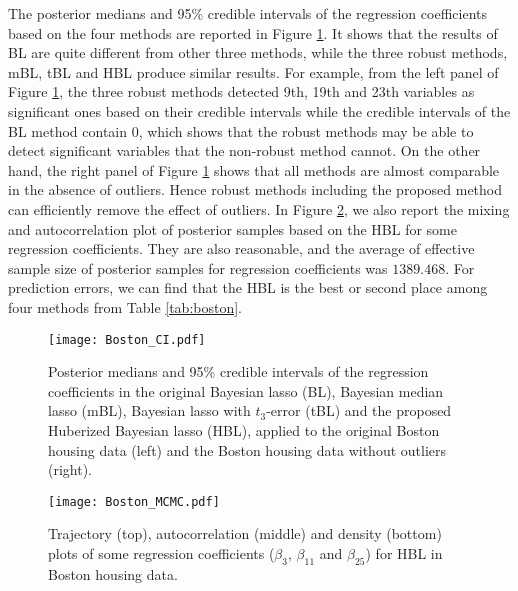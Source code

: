\documentclass[11pt]{article}
\theoremstyle{plain}
\theoremstyle{definition}
\begin{document}
The posterior medians and 95\% credible intervals of the regression coefficients based on the four methods are reported in Figure \ref{fig:boston_CI}. It shows that the results of BL are quite different from other three methods, while the three robust methods, mBL, tBL and HBL produce similar results. For example, from the left panel of Figure \ref{fig:boston_CI}, the three robust methods detected 9th, 19th and 23th variables as significant ones based on their credible intervals while the credible intervals of the BL method contain 0, which shows that the robust methods may be able to detect significant variables that the non-robust method cannot. On the other hand, the right panel of Figure \ref{fig:boston_CI} shows that all methods are almost comparable in the absence of outliers. Hence robust methods including the proposed method can efficiently remove the effect of outliers. In Figure \ref{fig:boston_MCMC}, we also report the mixing and autocorrelation plot of posterior samples based on the HBL for some regression coefficients. They are also reasonable, and the average of effective sample size of posterior samples for regression coefficients was $1389.468$. For prediction errors, we can find that the HBL is the best or second place among four methods from Table \ref{tab:boston}. 




\begin{figure}[htbp]
\centering
\texttt{[image: Boston\_CI.pdf]}
\caption{Posterior medians and 95\% credible intervals of the regression coefficients in the original Bayesian lasso (BL), Bayesian median  lasso (mBL), Bayesian lasso with $t_3$-error (tBL) and the proposed Huberized Bayesian lasso (HBL), applied to the original Boston housing data (left) and the Boston housing data without outliers (right).}
\label{fig:boston_CI}
\end{figure}

\begin{figure}[htbp]
\centering
\texttt{[image: Boston\_MCMC.pdf]}
\caption{Trajectory (top), autocorrelation (middle) and density (bottom) plots of some regression coefficients ($\beta_3$, $\beta_{11}$ and $\beta_{25}$) for HBL in Boston housing data.}
\label{fig:boston_MCMC}
\end{figure}
\end{document}
